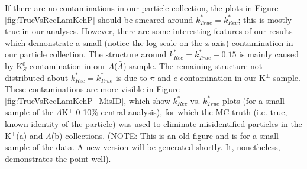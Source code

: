 \documentclass[../AnalysisNoteJBuxton.tex]{subfiles}
\begin{document}
If there are no contaminations in our particle collection, the plots in Figure \ref{fig:TrueVsRecLamKchP} should be smeared around $k^{*}_{True} = k^{*}_{Rec}$; this is mostly true in our analyses.
However, there are some interesting features of our results which demonstrate a small (notice the log-scale on the z-axis) contamination in our particle collection.
The structure around $k^{*}_{Rec} = k^{*}_{True}-0.15$ is mainly caused by K$^{0}_{S}$ contamination in our $\Lambda$($\bar{\Lambda}$) sample.
The remaining structure not distributed about $k^{*}_{Rec} = k^{*}_{True}$ is due to $\pi$ and $e$ contamination in our K$^{\pm}$ sample.
These contaminations are more visible in Figure \ref{fig:TrueVsRecLamKchP_MisID}, which show $k^{*}_{Rec}$ vs. $k^{*}_{True}$ plots (for a small sample of the $\Lambda$K$^{+}$ 0-10\% central analysis), for which the MC truth (i.e. true, known identity of the particle) was used to eliminate misidentified particles in the K$^{+}$(a) and $\Lambda$(b) collections. (NOTE: This is an old figure and is for a small sample of the data.  A new version will be generated shortly.  It, nonetheless, demonstrates the point well).
\end{document}
